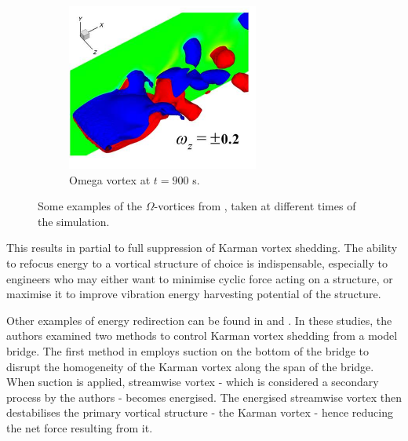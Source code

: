\documentclass[oneside]{utmthesis}
\begin{document}
\begin{figure}[!h]
    \begin{subfigure}[h]{0.45\textwidth}
      \includegraphics[width=\textwidth]{figs/omegaVortexA}
      \caption{Omega vortex at $t=900$ s.}
      \label{fig:omegaVortexA}
    \end{subfigure}

    \caption{Some examples of the $\Omega$-vortices from \citet{Lin2018}, taken at different times of the simulation.} \label{fig:omegaVortices}
  \end{figure}


  This results in partial to full suppression of Karman vortex shedding. The ability to refocus energy to a vortical structure of choice is indispensable, especially to engineers who may either want to minimise cyclic force acting on a structure, or maximise it to improve vibration energy harvesting potential of the structure.

Other examples of energy redirection can be found in \citet{Zhang2016} and \citet{Zhang2019}. In these studies, the authors examined two methods to control Karman vortex shedding from a model bridge. The first method in \citet{Zhang2016} employs suction on the bottom of the bridge to disrupt the homogeneity of the Karman vortex along the span of the bridge. When suction is applied, streamwise vortex - which is considered a secondary process by the authors - becomes energised. The energised streamwise vortex then destabilises the primary vortical structure - the Karman vortex - hence reducing the net force resulting from it.
\end{document}
